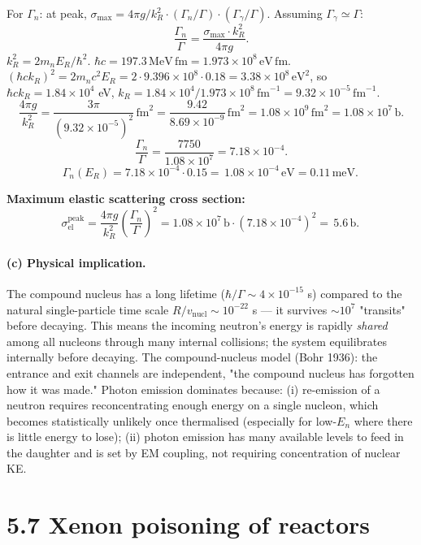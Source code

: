 \documentclass[11pt]{article}
\newcommand{\fm}{\,\mathrm{fm}}
\newcommand{\MeV}{\,\mathrm{MeV}}
\begin{document}
For $\Gamma_n$: at peak, $\sigma_\mathrm{max}=4\pi g/k_R^{2}\cdot(\Gamma_n/\Gamma)\cdot(\Gamma_\gamma/\Gamma)$. Assuming $\Gamma_\gamma\simeq\Gamma$:
\[
\frac{\Gamma_n}{\Gamma}=\frac{\sigma_\mathrm{max}\cdot k_R^{2}}{4\pi g}.
\]
$k_R^{2}=2 m_n E_R/\hbar^{2}$. $\hbar c=197.3\MeV\fm=1.973\times 10^{8}\,\mathrm{eV\,fm}$. $(\hbar c k_R)^{2}=2 m_n c^{2}E_R=2\cdot 9.396\times 10^{8}\cdot 0.18=3.38\times 10^{8}\,\mathrm{eV}^{2}$, so $\hbar c k_R=1.84\times 10^{4}$ eV, $k_R=1.84\times 10^{4}/1.973\times 10^{8}\fm^{-1}=9.32\times 10^{-5}\fm^{-1}$.
\[
\frac{4\pi g}{k_R^{2}}=\frac{3\pi}{(9.32\times 10^{-5})^{2}}\fm^{2}=\frac{9.42}{8.69\times 10^{-9}}\fm^{2}=1.08\times 10^{9}\fm^{2}=1.08\times 10^{7}\,\mathrm{b}.
\]
\[
\frac{\Gamma_n}{\Gamma}=\frac{7750}{1.08\times 10^{7}}=7.18\times 10^{-4}.
\]
\[
\Gamma_n(E_R)=7.18\times 10^{-4}\cdot 0.15=\boxed{\,1.08\times 10^{-4}\,\mathrm{eV}=0.11\,\mathrm{meV}.\,}
\]

\textbf{Maximum elastic scattering cross section:}
\[
\sigma_\mathrm{el}^\mathrm{peak}=\frac{4\pi g}{k_R^{2}}\!\left(\frac{\Gamma_n}{\Gamma}\right)^{2}=1.08\times 10^{7}\,\mathrm{b}\cdot(7.18\times 10^{-4})^{2}=\boxed{\,5.6\,\mathrm{b}.\,}
\]

\paragraph{(c) Physical implication.} The compound nucleus has a long lifetime ($\hbar/\Gamma\sim 4\times 10^{-15}$ s) compared to the natural single-particle time scale $R/v_\mathrm{nucl}\sim 10^{-22}$ s --- it survives $\sim 10^{7}$ "transits" before decaying. This means the incoming neutron's energy is rapidly \emph{shared} among all nucleons through many internal collisions; the system equilibrates internally before decaying. The compound-nucleus model (Bohr 1936): the entrance and exit channels are independent, "the compound nucleus has forgotten how it was made." Photon emission dominates because: (i) re-emission of a neutron requires reconcentrating enough energy on a single nucleon, which becomes statistically unlikely once thermalised (especially for low-$E_n$ where there is little energy to lose); (ii) photon emission has many available levels to feed in the daughter and is set by EM coupling, not requiring concentration of nuclear KE.

\section*{5.7 \quad Xenon poisoning of reactors}
\end{document}
